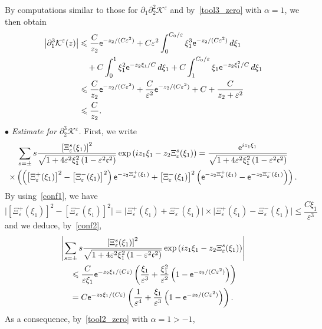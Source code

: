 \documentclass[AHL,Unicode,longabstracts,published]{cedram}
\newcommand*\p{\partial}
\newcommand*\BK{\mathcal{K}}
\newcommand*\ex{{\sf e}}
\newcommand*\cs{{\mathfrak c}}
\newcommand*\ls{\leqslant }
\newcommand*\e{\varepsilon}
\renewcommand*\a{\alpha}
\begin{document}
By computations similar to those for $ \p_1\p_2^2 \BK^\e $ and by~\eqref{tool3_zero} with $ \alpha = 1 $, we then obtain
\begin{align*}
\left\lvert \p_1^3 \BK^\e (z) \right\rvert &
\ls \frac{C}{ z_2 } \ex^{ - z_2 / (C\e^2) } + C \e^2 \int_0^{ C_0/ \e} \xi_1^3 \ex^{- z_2 / (C \e^2) } \, d\xi_1
\\ & \quad + C \int_0^{1} \xi_1^2 \ex^{- z_2 \xi_1 / C } \, d\xi_1 + C \int_1^{ C_0 /\e} \xi_1 \ex^{- z_2 \xi_1^2 / C } \, d\xi_1
\\ &
\ls \frac{C }{ z_2} \ex^{- z_2 / (C \e^2) } + \frac{C }{\e^2} \ex^{- z_2 / (C \e^2) } + C + \frac{C}{ z_2 + \e^2 }
\\ &
\ls \frac{C}{ z_2 }.
\end{align*}
$ \bullet $ \emph{Estimate for $ \p_2^3 \BK^\e $.} First, we write
\begin{multline*}
\sum_{ s = \pm} s \frac{ \left[\Xi_\e^s (\xi_1)\right]^2 }{\sqrt{1 + 4 \e^2 \xi_1^2 \left(1 - \e^2 \cs^2\right) } }
\exp\left(iz_1 \xi_1 - z_2 \Xi_\e^s (\xi_1)\right)
 = \frac{ \ex^{ iz_1 \xi_1 } }{\sqrt{1 + 4 \e^2 \xi_1^2 \left(1 - \e^2 \cs^2\right) } }
\\ \times \left(\left(\left[\Xi_\e^+ (\xi_1)\right]^2 - \left[\Xi_\e^- (\xi_1)\right]^2\right) \ex^{ - z_2 \Xi_\e^+ (\xi_1)} + \left[\Xi_\e^- (\xi_1)\right]^2 \left(\ex^{ - z_2 \Xi_\e^+ (\xi_1) } - \ex^{ - z_2 \Xi_\e^- (\xi_1) }\right) \right).
\end{multline*}
By using~\eqref{conf1}, we have
\[
\big\lvert \left[\Xi_\e^+ (\xi_1)\right]^2 - \left[\Xi_\e^- (\xi_1)\right]^2 \big\rvert = \big\lvert \Xi_\e^+ (\xi_1) + \Xi_\e^- (\xi_1) \big\rvert \times \big\lvert \Xi_\e^+ (\xi_1) - \Xi_\e^- (\xi_1) \big\rvert
\ls \frac{C\xi_1}{\e^3}
\]
and we deduce, by~\eqref{conf2},
\begin{multline*}
 \left\lvert \sum_{ s = \pm} s \frac{ \left[\Xi_\e^s (\xi_1)\right]^2 }{\sqrt{1 + 4 \e^2 \xi_1^2 \left(1 - \e^2 \cs^2\right) } }
\exp\left(iz_1 \xi_1 - z_2 \Xi_\e^s (\xi_1)\right) \right\rvert\\
\begin{aligned}
&\ls \frac{C}{\e \xi_1} \ex^{- z_2 \xi_1 / (C \e)}
\left(\frac{\xi_1}{\e^3} + \frac{\xi_1^2}{\e^2} \left(1 - \ex^{ - z_2 / (C\e^2)}\right) \right)
\\ & = C \ex^{- z_2 \xi_1 / (C \e)}
\left(\frac{1}{\e^4} + \frac{\xi_1}{\e^3} \left(1 - \ex^{ - z_2 / (C\e^2) }\right) \right).
\end{aligned}
\end{multline*}
As a consequence, by~\eqref{tool2_zero} with $ \a = 1 > -1 $,
\end{document}
